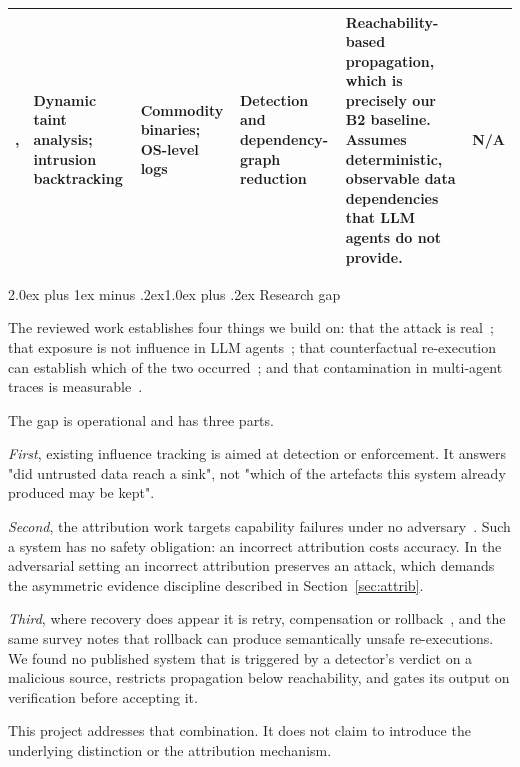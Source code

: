 \documentclass[10pt,twocolumn,a4paper]{article}
\makeatletter
\renewcommand{\subsection}{\@startsection{subsection}{2}{\z@}%
  {2.0ex plus 1ex minus .2ex}{1.0ex plus .2ex}%
  {\normalfont\normalsize\itshape}}
\newcommand{\btwo}{B2}
\makeatother
\begin{document}
\begin{table}[!tp]
\begin{tabular}{L{0.9cm} L{2.7cm} L{2.6cm} L{3.0cm} L{5.9cm} L{1.0cm}}
\cite{newsome2005}, \cite{king2003} & Dynamic taint analysis; intrusion
backtracking & Commodity binaries; OS-level logs &
Detection and dependency-graph reduction &
Reachability-based propagation, which is precisely our \btwo{} baseline.
Assumes deterministic, observable data dependencies that LLM agents do not
provide. & N/A \\

\bottomrule
\end{tabular}
\end{table}

\subsection{Research gap}

The reviewed work establishes four things we build on: that the attack is
real~\cite{greshake2023,liu2024}; that exposure is not influence in LLM
agents~\cite{neurotaint2026,granularity2026}; that counterfactual re-execution
can establish which of the two occurred~\cite{car2026,causalflow2026}; and that
contamination in multi-agent traces is measurable~\cite{tracelevel2026}.

The gap is operational and has three parts.

\emph{First}, existing influence tracking is aimed at detection or enforcement.
It answers "did untrusted data reach a sink", not "which of the artefacts this
system already produced may be kept".

\emph{Second}, the attribution work targets capability failures under no
adversary~\cite{car2026,causalflow2026}. Such a system has no safety
obligation: an incorrect attribution costs accuracy. In the adversarial setting
an incorrect attribution preserves an attack, which demands the asymmetric
evidence discipline described in Section~\ref{sec:attrib}.

\emph{Third}, where recovery does appear it is retry, compensation or
rollback~\cite{trustsurvey2026}, and the same survey notes that rollback can
produce semantically unsafe re-executions. We found no published system that is
triggered by a detector's verdict on a malicious source, restricts propagation
below reachability, and gates its output on verification before accepting it.

This project addresses that combination. It does not claim to introduce the
underlying distinction or the attribution mechanism.

\end{document}

